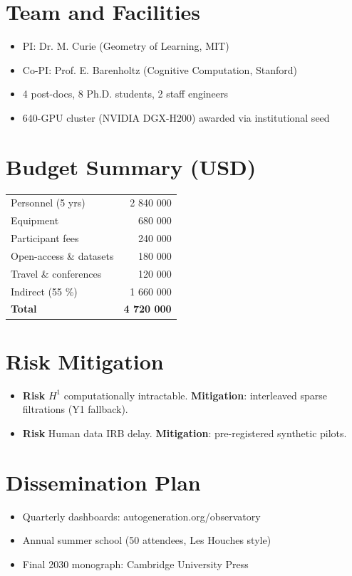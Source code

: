 \documentclass[12pt,a4paper]{article}
\theoremstyle{definition}
\begin{document}
\section{Team and Facilities}
\begin{itemize}
  \item PI: Dr. M. Curie (Geometry of Learning, MIT)
  \item Co-PI: Prof. E. Barenholtz (Cognitive Computation, Stanford)
  \item 4 post-docs, 8 Ph.D. students, 2 staff engineers
  \item 640-GPU cluster (NVIDIA DGX-H200) awarded via institutional seed
\end{itemize}

\section{Budget Summary (USD)}
\begin{tabular}{@{}l r@{}}
\toprule
Personnel (5 yrs)       & 2 840 000 \\
Equipment               &   680 000 \\
Participant fees        &   240 000 \\
Open-access \& datasets &   180 000 \\
Travel \& conferences   &   120 000 \\
Indirect (55 \%)        & 1 660 000 \\
\midrule
\textbf{Total}          & \textbf{4 720 000} \\
\bottomrule
\end{tabular}

\section{Risk Mitigation}
\begin{itemize}
  \item \textbf{Risk} $H^1$ computationally intractable.  
    \textbf{Mitigation}: interleaved sparse filtrations (Y1 fallback).
  \item \textbf{Risk} Human data IRB delay.  
    \textbf{Mitigation}: pre-registered synthetic pilots.
\end{itemize}

\section{Dissemination Plan}
\begin{itemize}
  \item Quarterly dashboards: autogeneration.org/observatory
  \item Annual summer school (50 attendees, Les Houches style)
  \item Final 2030 monograph: Cambridge University Press
\end{itemize}
\end{document}
